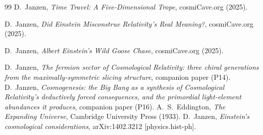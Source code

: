 \documentclass[11pt,a4paper]{article}
\theoremstyle{plain}
\theoremstyle{definition}
\theoremstyle{remark}
\begin{document}
\begin{thebibliography}{99}
D.~Janzen,
\emph{Time Travel: A Five-Dimensional Trope},
cosmiCave.org (2025).

D.~Janzen,
\emph{Did Einstein Misconstrue Relativity's Real Meaning?},
cosmiCave.org (2025).

D.~Janzen,
\emph{Albert Einstein's Wild Goose Chase},
cosmiCave.org (2025).

 D.~Janzen, \emph{The fermion sector of Cosmological Relativity: three chiral generations from the maximally-symmetric slicing structure}, companion paper (P14).
 D.~Janzen, \emph{Cosmogenesis: the Big Bang as a synthesis of Cosmological Relativity's deductively forced consequences, and the primordial light-element abundances it produces}, companion paper (P16).
 A.~S.~Eddington, \emph{The Expanding Universe}, Cambridge University Press (1933).
 D.~Janzen, \emph{Einstein's cosmological considerations}, arXiv:1402.3212 [physics.hist-ph].
\end{thebibliography}



\end{document}
